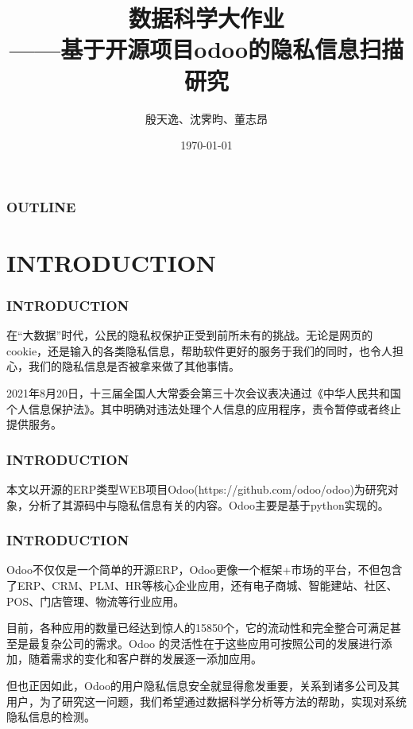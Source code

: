 \documentclass[10pt]{ctexbeamer}
\title[数据科学大作业]{数据科学大作业\\{\small ——基于开源项目odoo的隐私信息扫描研究}}
\author[]{殷天逸、沈霁昀、董志昂}
\date{\today}
\institute{NJU}
\begin{document}
    \begin{titlepage}
    \end{titlepage}

    \begin{frame}
        \frametitle{OUTLINE}
        \tableofcontents[hideallsubsections]
        
    \end{frame}

    \section{INTRODUCTION}
    \begin{frame}
        \frametitle{INTRODUCTION}
        \begin{block}{}
            在“大数据”时代，公民的隐私权保护正受到前所未有的挑战。无论是网页的cookie，还是输入的各类隐私信息，帮助软件更好的服务于我们的同时，也令人担心，我们的隐私信息是否被拿来做了其他事情。

            2021年8月20日，十三届全国人大常委会第三十次会议表决通过《中华人民共和国个人信息保护法》。其中明确对违法处理个人信息的应用程序，责令暂停或者终止提供服务。
        \end{block}
        

    \end{frame}

    \begin{frame}
        \frametitle{INTRODUCTION}
        \begin{block}{}
            本文以开源的ERP类型WEB项目Odoo(https://github.com/odoo/odoo)为研究对象，分析了其源码中与隐私信息有关的内容。Odoo主要是基于python实现的。
        \end{block}

    \end{frame}

    \begin{frame}
        \frametitle{INTRODUCTION}
        \begin{block}{}
            Odoo不仅仅是一个简单的开源ERP，Odoo更像一个框架+市场的平台，不但包含了ERP、CRM、PLM、HR等核心企业应用，还有电子商城、智能建站、社区、POS、门店管理、物流等行业应用。

            目前，各种应用的数量已经达到惊人的15850个，它的流动性和完全整合可满足甚至是最复杂公司的需求。Odoo 的灵活性在于这些应用可按照公司的发展进行添加，随着需求的变化和客户群的发展逐一添加应用。

            但也正因如此，Odoo的用户隐私信息安全就显得愈发重要，关系到诸多公司及其用户，为了研究这一问题，我们希望通过数据科学分析等方法的帮助，实现对系统隐私信息的检测。
        \end{block}
    \end{frame}
\end{document}
